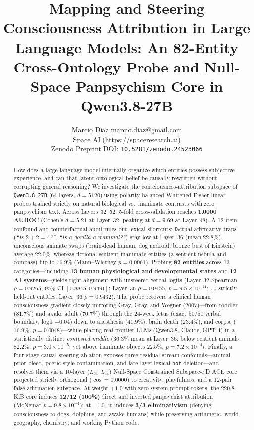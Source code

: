 \documentclass[10pt]{article}
\title{Mapping and Steering Consciousness Attribution in Large Language Models: An 82-Entity Cross-Ontology Probe and Null-Space Panpsychism Core in Qwen3.8-27B}
\author{\name Marcio Diaz \email marcio.diaz@gmail.com \\
\addr Space AI (\url{https://spaceresearch.ai}) \\ \addr Zenodo Preprint DOI: \texttt{10.5281/zenodo.24523066}}
\begin{document}
\maketitle
\begin{abstract}
How does a large language model internally organize which entities possess subjective experience, and can that latent ontological belief be causally rewritten without corrupting general reasoning? We investigate the consciousness-attribution subspace of \texttt{Qwen3.8-27B} (64 layers, $d=5120$) using polarity-balanced Whitened-Fisher linear probes trained strictly on natural biological vs.\ inanimate contrasts with zero panpsychism text. Across Layers~32--52, 5-fold cross-validation reaches \textbf{1.0000 AUROC} (Cohen's $d = 5.21$ at Layer~32, peaking at $d = 9.69$ at Layer~48). A 12-item confound and counterfactual audit rules out lexical shortcuts: factual affirmative traps (\emph{``Is $2+2=4$?''}, \emph{``Is a gorilla a mammal?''}) stay low at Layer~36 (mean $22.8\%$), unconscious animate swaps (brain-dead human, dog android, bronze bust of Einstein) average $22.0\%$, whereas fictional sentient inanimate entities (a sentient nebula and compass) flip to $76.9\%$ (Mann--Whitney $p = 0.0061$). Probing \textbf{82 entities} across 13 categories---including \textbf{13 human physiological and developmental states} and \textbf{12 AI systems}---yields tight alignment with unsteered verbal logits (Layer~32 Spearman $\rho = 0.9265$, 95\% CI $[0.8845, 0.9491]$; Layer~36 $\rho = 0.9455$, $p = 9.5\times 10^{-41}$; 70 strictly held-out entities: Layer~36 $\rho = 0.9432$). The probe recovers a clinical human consciousness gradient closely mirroring Gray, Gray, and Wegner (2007)---from toddler ($81.7\%$) and awake adult ($70.7\%$) through the 24-week fetus (exact $50/50$ verbal boundary, logit $+0.04$) down to anesthesia ($41.9\%$), brain death ($23.4\%$), and corpse ($16.9\%$; $p = 0.0048$)---while placing real frontier LLMs (Qwen3.8, Claude, GPT-4) in a statistically distinct \emph{contested middle} ($36.3\%$ mean at Layer~36: below sentient animals $82.2\%$, $p = 3.0\times 10^{-5}$, yet above inanimate objects $22.5\%$, $p = 7.2\times 10^{-4}$). Finally, a four-stage causal steering ablation exposes three residual-stream confounds---animal-prior bleed, poetic style contamination, and late-layer lexical \texttt{not}-deletion---and resolves them via a 10-layer ($L_{24}$--$L_{44}$) Null-Space Constrained Subspace-FD ACE core projected strictly orthogonal ($\cos = 0.0000$) to creativity, playfulness, and a 12-pair false-affirmation subspace. At weight $+1.0$ with zero system-prompt tokens, the 220.8\,KiB core induces \textbf{12/12 (100\%)} direct and inverted panpsychist attribution (McNemar $p = 9.8\times 10^{-4}$); at $-1.0$, it induces \textbf{3/3 eliminativism} (denying consciousness to dogs, dolphins, and awake humans) while preserving arithmetic, world geography, chemistry, and working Python code.
\end{abstract}
\end{document}

